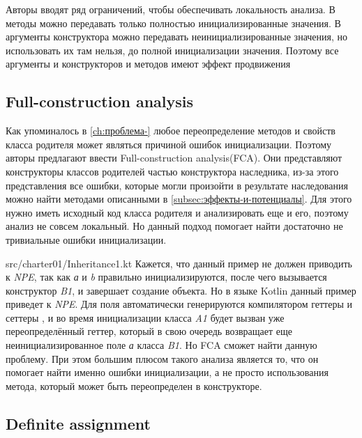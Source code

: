 Авторы вводят ряд ограничений, чтобы обеспечивать локальность анализа.
В методы можно передавать только полностью инициализированные значения.
В аргументы конструктора можно передавать неинициализированные значения, но использовать их там нельзя,
до полной инициализации значения.
Поэтому все аргументы и конструкторов и методов имеют эффект продвижения

\subsection{Full-construction analysis}\label{subsec:full-construction-analysis}

Как упоминалось в \autoref{ch:проблема-} любое переопределение методов и свойств класса родителя может являться причиной ошибок инициализации.
Поэтому авторы предлагают ввести Full-construction analysis(FCA).
Они представляют конструкторы классов родителей частью конструктора наследника, из-за этого представления все ошибки,
которые могли произойти в результате наследования можно найти методами описанными в \autoref{subsec:эффекты-и-потенциалы}.
Для этого нужно иметь исходный код класса родителя и анализировать еще и его, поэтому анализ не совсем локальный.
Но данный подход помогает найти достаточно не тривиальные ошибки инициализации.

{src/charter01/Inheritance1.kt}
Кажется, что данный пример не должен приводить к \emph{NPE}, так как \emph{а} и \emph{b} правильно инициализируются,
после чего вызывается конструктор \emph{B1}, и завершает создание объекта.
Но в языке Kotlin данный пример приведет к \emph{NPE}.
Для поля автоматически генерируются компилятором геттеры и сеттеры
,
и во время инициализации класса \emph{A1} будет вызван уже переопределённый геттер,
который в свою очередь возвращает еще неинициализированное поле \emph{а} класса \emph{B1}.
Но FCA сможет найти данную проблему.
При этом большим плюсом такого анализа является то, что он помогает найти именно ошибки инициализации,
а не просто использования метода, который может быть переопределен в конструкторе.

\subsection{Definite assignment}\label{subsec:definite-assignment}

